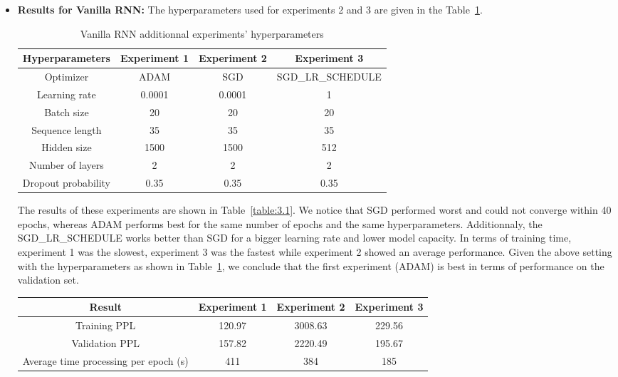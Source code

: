 \begin{itemize}
	\item[1)] \textbf{Results for Vanilla RNN:}
	The hyperparameters used for experiments 2 and 3 are given in the Table~\ref{table:3}.\\
	\begin{table}[H]
		\centering
		\begin{tabular}{||c c c c||} 
			\hline
			\textbf{Hyperparameters} & \textbf{Experiment 1} &\textbf{Experiment 2} & \textbf{Experiment 3}\\[0.5ex] 
			\hline
			Optimizer & ADAM & SGD & SGD\_LR\_SCHEDULE \\
			Learning rate & 0.0001 & 0.0001 & 1  \\
			Batch size &20 & 20 &20 \\
			Sequence length &35 & 35 & 35\\
			Hidden size & 1500 & 1500 & 512 \\
			Number of layers & 2 & 2 & 2 \\
			Dropout probability & 0.35 & 0.35 &0.35 \\[1ex]
			\hline
		\end{tabular}
		\caption{Vanilla RNN additionnal experiments' hyperparameters}
		\label{table:3}
	\end{table}
	The results of these experiments are shown in  Table~\ref{table:3.1}. We notice that SGD performed worst and could not converge within 40 epochs, whereas ADAM performs best for the same number of epochs and the same hyperparameters. Additionnaly, the SGD\_LR\_SCHEDULE works better than SGD for a bigger learning rate and lower model capacity. In terms of training time, experiment 1 was the slowest, experiment 3 was the fastest while experiment 2 showed an average performance. 
	Given the above setting with the hyperparameters as shown in Table~\ref{table:3}, we conclude that the first experiment (ADAM) is best in terms of performance on the validation set. 
	\begin{table}[H]
		\centering
		\begin{tabular}{||c c c c||} 
			\hline
			\textbf{Result} & \textbf{Experiment 1} & \textbf{Experiment 2}& \textbf{Experiment 3} \\[0.5ex] 
			\hline
			Training PPL & 120.97 & 3008.63 & 229.56 \\
			Validation PPL & 157.82 & 2220.49 & 195.67  \\
			Average time processing per epoch (s) & 411 & 384 & 185 \\[1ex]

\end{tabular}
\end{table}
\end{itemize}
